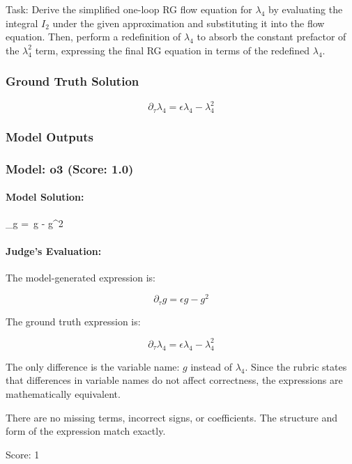 \documentclass[10pt]{article}
\begin{document}
Task:
Derive the simplified one-loop RG flow equation for $\lambda_4$ by evaluating the integral $I_2$ under the given approximation and substituting it into the flow equation. Then, perform a redefinition of $\lambda_4$ to absorb the constant prefactor of the $\lambda_4^2$ term, expressing the final RG equation in terms of the redefined $\lambda_4$.

\subsubsection*{Ground Truth Solution}
\[ \boxed{\partial_\tau \lambda_4 = \epsilon \lambda_4 - \lambda_4^2} \]

\subsubsection*{Model Outputs}
\subsubsection*{Model: o3 (Score: 1.0)}
\paragraph*{Model Solution:}
\; \partial_\tau g = \epsilon\,g - g^{2}\;

\paragraph*{Judge's Evaluation:}

The model-generated expression is:

\[
\partial_\tau g = \epsilon g - g^2
\]

The ground truth expression is:

\[
\partial_\tau \lambda_4 = \epsilon \lambda_4 - \lambda_4^2
\]

The only difference is the variable name: \(g\) instead of \(\lambda_4\). Since the rubric states that differences in variable names do not affect correctness, the expressions are mathematically equivalent.

There are no missing terms, incorrect signs, or coefficients. The structure and form of the expression match exactly.

Score: 1

\newpage
\end{document}
